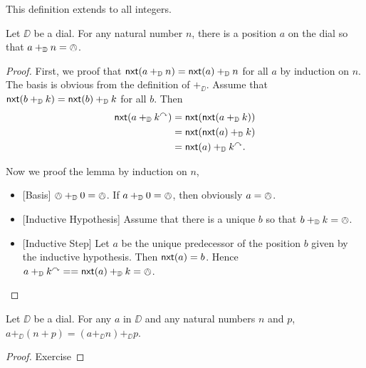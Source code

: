 This definition extends to all integers.

\begin{lem}
	Let $\DD$ be a dial.
	For any natural number $n$, there is a position $a$ on the dial so that $a+_{\mathbb D} n = \owedge$.
	
	\begin{proof}
		First, we proof that ${\mathord{\textsf{nxt}}}(a +_{\mathbb D} n) = {\mathord{\textsf{nxt}}}(a) +_{\mathbb D} n$ for all $a$ by induction on $n$. The basis is obvious from the definition of $+_\DD$. Assume that ${\mathord{\textsf{nxt}}}(b +_{\mathbb D} k) = {\mathord{\textsf{nxt}}}(b) +_{\mathbb D} k$ for all $b$. Then 
		\begin{align*}
		{\mathord{\textsf{nxt}}}(a +_{\mathbb D} k^\curvearrowright) &= {\mathord{\textsf{nxt}}}({\mathord{\textsf{nxt}}}(a+_{\mathbb D} k))\\
		                    &= {\mathord{\textsf{nxt}}}({\mathord{\textsf{nxt}}}(a) +_{\mathbb D} k)\\
		                    &= {\mathord{\textsf{nxt}}}(a) +_{\mathbb D} k^\curvearrowright.
		\end{align*}
		
		Now we proof the lemma by induction on $n$,
		\begin{itemize}
			\item{}[Basis] $\owedge +_{\mathbb D} 0 = \owedge$. If $a +_{\mathbb D} 0 = \owedge$, then obviously $a=\owedge$.
			\item{}[Inductive Hypothesis] Assume that there is a unique $b$ so that $b +_{\mathbb D} k = \owedge$.
			\item{}[Inductive Step] Let $a$ be the unique predecessor of the position $b$ given by the inductive hypothesis. Then ${\mathord{\textsf{nxt}}}(a)=b$. Hence $a +_{\mathbb D} k^\curvearrowright = = {\mathord{\textsf{nxt}}}(a) +_{\mathbb D} k = \owedge$. 
		\end{itemize}
	\end{proof}
\end{lem}


\begin{lem}\label{lem:modular-addition}
	Let $\DD$ be a dial.
	For any $a$ in $\DD$ and any natural numbers $n$ and $p$, $a +_\DD (n+p) = (a +_\DD n) +_\DD p$.
	
	\begin{proof}
		Exercise
	\end{proof}
\end{lem}

